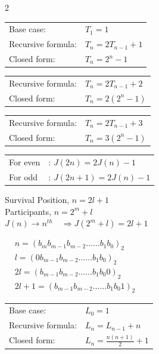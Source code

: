\begin{multicols}{2}
\begin{tabular}{ll}
   Base case: & $T_1 = 1$ \\
   Recursive formula: & $T_n = 2T_{n-1} + 1$ \\
   Closed form: & $T_n = 2^n - 1$
\end{tabular}

\begin{tabular}{ll}
   Recursive formula: & $T_n = 2T_{n-1} + 2$ \\
   Closed form: & $T_n = 2(2^n - 1)$
\end{tabular}

\begin{tabular}{ll}
   Recursive formula: & $T_n = 2T_{n-1} + 3$ \\
   Closed form: & $T_n = 3(2^n - 1)$
\end{tabular}

\begin{tabular}{ll}
   For even &: $J(2n) = 2J(n)-1$\\
   For odd &: $J(2n+1) = 2J(n) - 1$
\end{tabular}

Survival Position, $n = 2l+1$\\[0.5em]
Participants, $n = 2^m + l$\\[0.5em]
$J(n) \to n^{th}  \quad \Rightarrow J(2^m + l) = 2l+1$

$\begin{aligned}
   & n = (b_m b_{m-1} b_{m-2} \ldots\ldots b_1 b_0)_2 \\
   & l = (0 b_{m-1} b_{m-2} \ldots\ldots b_1 b_0)_2 \\
   & 2l = (b_{m-1} b_{m-2} \ldots\ldots b_1 b_0 0)_2 \\
   & 2l+1 = (b_{m-1} b_{m-2} \ldots\ldots b_1 b_0 1)_2
\end{aligned}$


\begin{tabular}{ll}
   Base case: & $L_0 = 1$ \\
   Recursive formula: & $L_n = L_{n-1} + n$ \\
   Closed form: & $L_n = \frac{n(n+1)}{2}+1$
\end{tabular}


\end{multicols}
